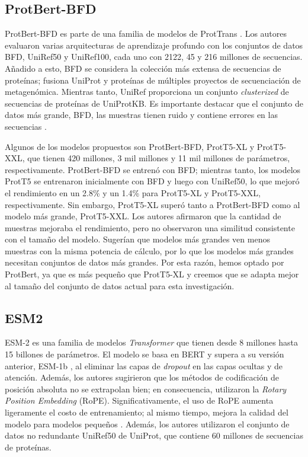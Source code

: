 \subsection{ProtBert-BFD}

ProtBert-BFD es parte de una familia de modelos de ProtTrans \citep{elnaggar2021prottrans}. Los autores evaluaron varias arquitecturas de aprendizaje profundo con los conjuntos de datos BFD, UniRef50 y UniRef100, cada uno con 2122, 45 y 216 millones de secuencias. Añadido a esto, BFD se considera la colección más extensa de secuencias de proteínas; fusiona UniProt \citep{uniprot2019uniprot} y proteínas de múltiples proyectos de secuenciación de metagenómica. Mientras tanto, UniRef \citep{suzek2015uniref} proporciona un conjunto \textit{clusterized} de secuencias de proteínas de UniProtKB. Es importante destacar que el conjunto de datos más grande, BFD, las muestras tienen ruido y contiene errores en las secuencias \citep{elnaggar2021prottrans}.

Algunos de los modelos propuestos son ProtBert-BFD, ProtT5-XL y ProtT5-XXL, que tienen 420 millones, 3 mil millones y 11 mil millones de parámetros, respectivamente. ProtBert-BFD se entrenó con BFD; mientras tanto, los modelos ProtT5 se entrenaron inicialmente con BFD y luego con UniRef50, lo que mejoró el rendimiento en un 2.8\% y un 1.4\% para ProtT5-XL y ProtT5-XXL, respectivamente. Sin embargo, ProtT5-XL superó tanto a ProtBert-BFD como al modelo más grande, ProtT5-XXL. Los autores afirmaron que la cantidad de muestras mejoraba el rendimiento, pero no observaron una similitud consistente con el tamaño del modelo. Sugerían que modelos más grandes ven menos muestras con la misma potencia de cálculo, por lo que los modelos más grandes necesitan conjuntos de datos más grandes. Por esta razón, hemos optado por ProtBert, ya que es más pequeño que ProtT5-XL y creemos que se adapta mejor al tamaño del conjunto de datos actual para esta investigación.

\subsection{ESM2}


ESM-2 \citep{lin2023evolutionary} es una familia de modelos \textit{Transformer} que tienen  desde 8 millones hasta 15 billones de parámetros. El modelo se basa en BERT \citep{devlin2018bert} y supera a su versión anterior, ESM-1b \citep{rives2021biological}, al eliminar las capas de \textit{dropout} en las capas ocultas y de atención. Además, los autores sugirieron que los métodos de codificación de posición absoluta no se extrapolan bien; en consecuencia, utilizaron la \textit{Rotary Position Embedding} (RoPE). Significativamente, el uso de RoPE aumenta ligeramente el costo de entrenamiento; al mismo tiempo, mejora la calidad del modelo para modelos pequeños \citep{lin2023evolutionary}. Además, los autores utilizaron el conjunto de datos no redundante UniRef50 \citep{suzek2015uniref} de UniProt, que contiene 60 millones de secuencias de proteínas.



